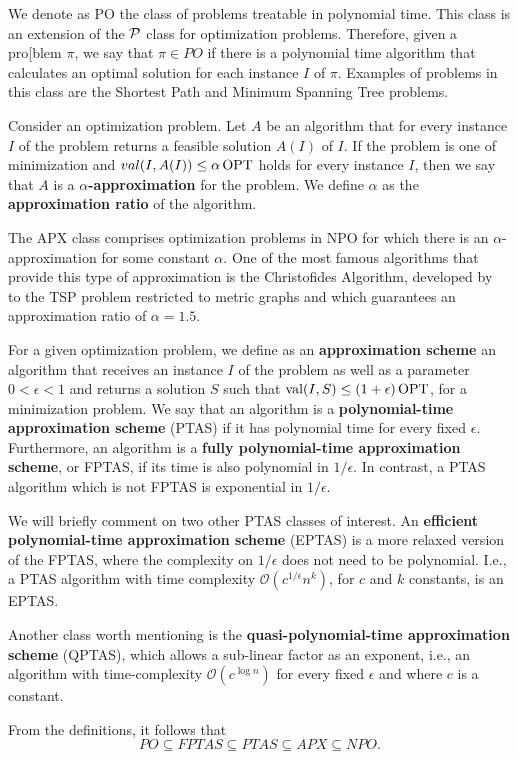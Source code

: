 We denote as PO the class of problems treatable in polynomial time. This class is an extension of the \(\mathcal{P}\) class for optimization problems. Therefore, given a pro[blem \(\pi\), we say that \(\pi \in PO\) if there is a polynomial time algorithm that calculates an optimal solution for each instance \(I\) of \(\pi\). Examples of problems in this class are the Shortest Path and Minimum Spanning Tree problems.

Consider an optimization problem. Let \(A\) be an algorithm that for every instance \(I\) of the problem returns a feasible solution \(A(I)\) of \(I\). If the problem is one of minimization and \(val(I, A(I)) \leq \alpha \operatorname{\textrm{OPT}}\) holds for every instance \(I\), then we say that \(A\) is a \textbf{\(\alpha\)-approximation} for the problem. We define \(\alpha\) as the \textbf{approximation ratio} of the algorithm.

The APX class comprises optimization problems in NPO for which there is an \(\alpha\)-approximation for some constant \(\alpha\). One of the most famous algorithms that provide this type of approximation is the Christofides Algorithm, developed by~\cite{Christofides2022WorstCaseAO} to the TSP problem restricted to metric graphs and which guarantees an approximation ratio of \(\alpha = 1.5\).

For a given optimization problem, we define as an \textbf{approximation scheme} an algorithm that receives an instance \(I\) of the problem as well as a parameter \(0 < \epsilon < 1\) and returns a solution \(S\) such that \(\operatorname{\textrm{val}}(I, S) \leq (1 + \epsilon) \operatorname{\textrm{OPT}}\), for a minimization problem. We say that an algorithm is a \textbf{polynomial-time approximation scheme} (PTAS) if it has polynomial time for every fixed \(\epsilon\). Furthermore, an algorithm is a \textbf{fully polynomial-time approximation scheme}, or FPTAS, if its time is also polynomial in \(1 / \epsilon\). In contrast, a PTAS algorithm which is not FPTAS is exponential in \(1 / \epsilon\).

We will briefly comment on two other PTAS classes of interest. An \textbf{efficient polynomial-time approximation scheme} (EPTAS) is a more relaxed version of the FPTAS, where the complexity on \(1 / \epsilon\) does not need to be polynomial. I.e., a PTAS algorithm with time complexity \(\mathcal{O}(c^{1 / \epsilon} n^k)\), for \(c\) and \(k\) constants, is an EPTAS.

Another class worth mentioning is the \textbf{quasi-polynomial-time approximation scheme} (QPTAS), which allows a sub-linear factor as an exponent, i.e., an algorithm with time-complexity \(\mathcal{O}(c^{\log{n}})\) for every fixed \(\epsilon\) and where \(c\) is a constant.

From the definitions, it follows that \[PO \subseteq FPTAS \subseteq PTAS \subseteq APX \subseteq NPO.\]
